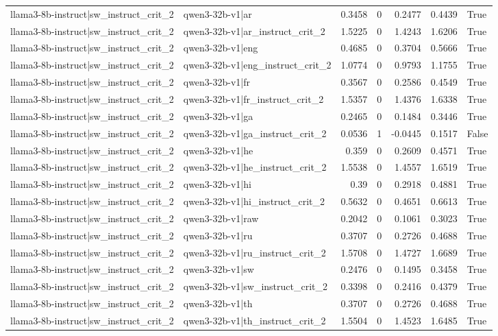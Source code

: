 \begin{table}
\begin{tabular}{l l r r r r l}
llama3-8b-instruct|sw_instruct_crit_2 & qwen3-32b-v1|ar & 0.3458 & 0 & 0.2477 & 0.4439 & True \\
llama3-8b-instruct|sw_instruct_crit_2 & qwen3-32b-v1|ar_instruct_crit_2 & 1.5225 & 0 & 1.4243 & 1.6206 & True \\
llama3-8b-instruct|sw_instruct_crit_2 & qwen3-32b-v1|eng & 0.4685 & 0 & 0.3704 & 0.5666 & True \\
llama3-8b-instruct|sw_instruct_crit_2 & qwen3-32b-v1|eng_instruct_crit_2 & 1.0774 & 0 & 0.9793 & 1.1755 & True \\
llama3-8b-instruct|sw_instruct_crit_2 & qwen3-32b-v1|fr & 0.3567 & 0 & 0.2586 & 0.4549 & True \\
llama3-8b-instruct|sw_instruct_crit_2 & qwen3-32b-v1|fr_instruct_crit_2 & 1.5357 & 0 & 1.4376 & 1.6338 & True \\
llama3-8b-instruct|sw_instruct_crit_2 & qwen3-32b-v1|ga & 0.2465 & 0 & 0.1484 & 0.3446 & True \\
llama3-8b-instruct|sw_instruct_crit_2 & qwen3-32b-v1|ga_instruct_crit_2 & 0.0536 & 1 & -0.0445 & 0.1517 & False \\
llama3-8b-instruct|sw_instruct_crit_2 & qwen3-32b-v1|he & 0.359 & 0 & 0.2609 & 0.4571 & True \\
llama3-8b-instruct|sw_instruct_crit_2 & qwen3-32b-v1|he_instruct_crit_2 & 1.5538 & 0 & 1.4557 & 1.6519 & True \\
llama3-8b-instruct|sw_instruct_crit_2 & qwen3-32b-v1|hi & 0.39 & 0 & 0.2918 & 0.4881 & True \\
llama3-8b-instruct|sw_instruct_crit_2 & qwen3-32b-v1|hi_instruct_crit_2 & 0.5632 & 0 & 0.4651 & 0.6613 & True \\
llama3-8b-instruct|sw_instruct_crit_2 & qwen3-32b-v1|raw & 0.2042 & 0 & 0.1061 & 0.3023 & True \\
llama3-8b-instruct|sw_instruct_crit_2 & qwen3-32b-v1|ru & 0.3707 & 0 & 0.2726 & 0.4688 & True \\
llama3-8b-instruct|sw_instruct_crit_2 & qwen3-32b-v1|ru_instruct_crit_2 & 1.5708 & 0 & 1.4727 & 1.6689 & True \\
llama3-8b-instruct|sw_instruct_crit_2 & qwen3-32b-v1|sw & 0.2476 & 0 & 0.1495 & 0.3458 & True \\
llama3-8b-instruct|sw_instruct_crit_2 & qwen3-32b-v1|sw_instruct_crit_2 & 0.3398 & 0 & 0.2416 & 0.4379 & True \\
llama3-8b-instruct|sw_instruct_crit_2 & qwen3-32b-v1|th & 0.3707 & 0 & 0.2726 & 0.4688 & True \\
llama3-8b-instruct|sw_instruct_crit_2 & qwen3-32b-v1|th_instruct_crit_2 & 1.5504 & 0 & 1.4523 & 1.6485 & True \\

\end{tabular}
\end{table}
